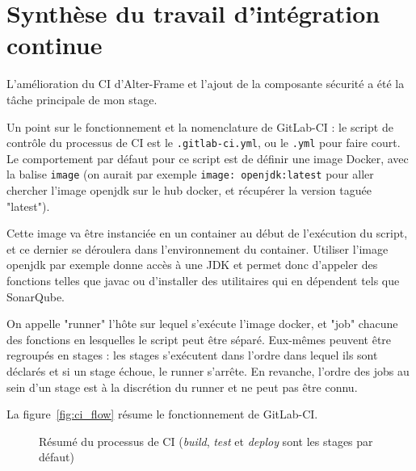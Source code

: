 \section{Synthèse du travail d'intégration continue}
\label{sec:synthese_ci}
L'amélioration du CI d'Alter-Frame et l'ajout de la composante sécurité a été la tâche principale de mon stage.

Un point sur le fonctionnement et la nomenclature de GitLab-CI\cite{gitlab_ci_workflow} : le script de contrôle du processus de CI est le \texttt{.gitlab-ci.yml}, ou le \texttt{.yml} pour faire court. Le comportement par défaut pour ce script est de définir une image Docker, avec la balise \texttt{image} (on aurait par exemple \texttt{image: openjdk:latest} pour aller chercher l'image openjdk sur le hub docker, et récupérer la version taguée "latest").

Cette image va être instanciée en un container au début de l'exécution du script, et ce dernier se déroulera dans l'environnement du container. Utiliser l'image openjdk par exemple donne accès à une JDK et permet donc d'appeler des fonctions telles que javac ou d'installer des utilitaires qui en dépendent tels que SonarQube.

On appelle "runner" l'hôte sur lequel s'exécute l'image docker, et "job" chacune des fonctions en lesquelles le script peut être séparé. Eux-mêmes peuvent être regroupés en stages : les stages s'exécutent dans l'ordre dans lequel ils sont déclarés et si un stage échoue, le runner s'arrête. En revanche, l'ordre des jobs au sein d'un stage est à la discrétion du runner et ne peut pas être connu.

La figure~\ref{fig:ci_flow} résume le fonctionnement de GitLab-CI.

\begin{figure}
	\centering
	\caption{Résumé du processus de CI (\emph{build}, \emph{test} et \emph{deploy} sont les stages par défaut)}
	\label{fig:ci_process}
\end{figure}

